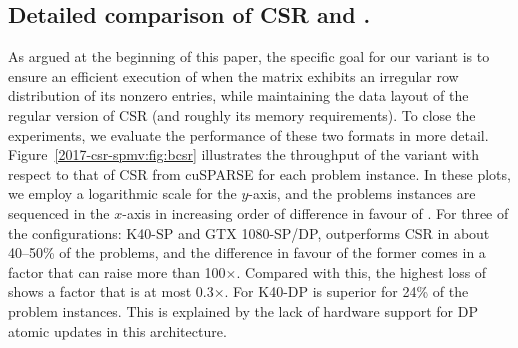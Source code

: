 \subsection{Detailed comparison of CSR and \bcsr.}
As argued at the beginning of this paper,
the specific goal for our \bcsr variant
is to ensure an efficient execution of \spmv
when the matrix exhibits an irregular row distribution of its nonzero entries,
while maintaining the data layout of the regular version of CSR
(and roughly its memory requirements).
To close the experiments, we evaluate the performance of these two formats in more detail.
Figure~\ref{2017-csr-spmv:fig:bcsr} illustrates the throughput of
the \bcsr variant with respect to that of CSR from cuSPARSE
for each problem instance.
In these plots, we employ a logarithmic scale for the $y$-axis,
and the problems instances are sequenced in the
$x$-axis in increasing order of difference in favour of \bcsr.
For three of the configurations: K40-SP and GTX 1080-SP/DP,
\bcsr outperforms CSR in about 40--50\% of the problems,
and the difference in favour of the former
comes in a factor that can raise more than 100$\times$.
Compared with this, the highest loss of \bcsr
shows a factor that is at most 0.3$\times$.
For  K40-DP
\bcsr is superior for 24\% of the problem instances.
This is explained by the lack of hardware support for DP atomic updates in this architecture.

